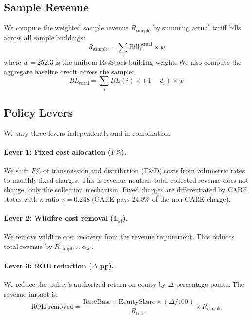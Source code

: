 \documentclass[11pt]{article}
\begin{document}
\subsection{Sample Revenue}

We compute the weighted sample revenue $R_{\text{sample}}$ by summing actual tariff bills across all sample buildings:
\begin{equation}
R_{\text{sample}} = \sum_i \text{Bill}_i^{\text{actual}} \times w
\end{equation}
where $w = 252.3$ is the uniform ResStock building weight. We also compute the aggregate baseline credit across the sample:
\begin{equation}
BL_{\text{total}} = \sum_i BL(i) \times (1 - d_i) \times w
\end{equation}

\subsection{Policy Levers}

We vary three levers independently and in combination.

\paragraph{Lever 1: Fixed cost allocation ($F\%$).} We shift $F\%$ of transmission and distribution (T\&D) costs from volumetric rates to monthly fixed charges. This is revenue-neutral: total collected revenue does not change, only the collection mechanism. Fixed charges are differentiated by CARE status with a ratio $\gamma = 0.248$ (CARE pays 24.8\% of the non-CARE charge).

\paragraph{Lever 2: Wildfire cost removal ($\mathbb{1}_{\text{wf}}$).} We remove wildfire cost recovery from the revenue requirement. This reduces total revenue by $R_{\text{sample}} \times \alpha_{\text{wf}}$.

\paragraph{Lever 3: ROE reduction ($\Delta$ pp).} We reduce the utility's authorized return on equity by $\Delta$ percentage points. The revenue impact is:
\begin{equation}
\text{ROE removed} = \frac{\text{RateBase} \times \text{EquityShare} \times (\Delta / 100)}{R_{\text{total}}} \times R_{\text{sample}}
\end{equation}
\end{document}
